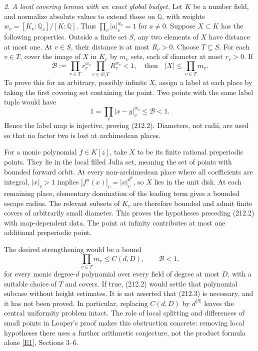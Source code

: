 \documentclass[11pt,a4paper]{article}
\newcommand{\Q}{\mathbb{Q}}
\newcommand{\eref}[2]{\hyperlink{extra:#1:#2}{[E#2]}}
\begin{document}
\textit{2. A local covering lemma with an exact global budget.}
Let $K$ be a number field, and normalize absolute values to extend those on
$\Q$, with weights $w_v=[K_v:\Q_v]/[K:\Q]$. Thus
$\prod_v|a|_v^{w_v}=1$ for $a\ne0$. Suppose $X\subset K$ has the following
properties. Outside a finite set $S$, any two elements of $X$ have distance
at most one. At $v\in S$, their distance is at most $R_v>0$. Choose
$T\subseteq S$. For each $v\in T$, cover the image of $X$ in $K_v$ by
$m_v$ sets, each of diameter at most $r_v>0$. If
\[
 \mathcal B:=\prod_{v\in T}r_v^{w_v}
             \prod_{v\in S\setminus T}R_v^{w_v}<1,
 \quad\text{then}\quad |X|\le\prod_{v\in T}m_v.                 \tag{212.2}
\]
To prove this for an arbitrary, possibly infinite $X$, assign a label at
each place by taking the first covering set containing the point. Two
points with the same label tuple would have
\[
 1=\prod_v|x-y|_v^{w_v}\le\mathcal B<1.
\]
Hence the label map is injective, proving (212.2). Diameters, not radii,
are used so that no factor two is lost at archimedean places.

For a monic polynomial $f\in K[z]$, take $X$ to be its finite rational
preperiodic points. They lie in the local filled Julia set, meaning the set
of points with bounded forward orbit. At every non-archimedean place where
all coefficients are integral, $|x|_v>1$ implies
$|f^n(x)|_v=|x|_v^{d^n}$, so $X$ lies in the unit disk. At each remaining
place, elementary domination of the leading term gives a bounded escape
radius. The relevant subsets of $K_v$ are therefore bounded and admit finite
covers of arbitrarily small diameter. This proves the hypotheses preceding
(212.2) with map-dependent data. The point at infinity contributes at most
one additional preperiodic point.

The desired strengthening would be a bound
\[
 \prod_{v\in T}m_v\le C(d,D),\qquad\mathcal B<1,                \tag{212.3}
\]
for every monic degree-$d$ polynomial over every field of degree at most
$D$, with a suitable choice of $T$ and covers. If true, (212.2) would settle
that polynomial subcase without height estimates. It is not asserted that
(212.3) is necessary, and it has not been proved. In particular, replacing
$C(d,D)$ by $d^{|S|}$ leaves the central uniformity problem intact. The role
of local splitting and differences of small points in Looper's proof makes
this obstruction concrete: removing local hypotheses there uses a further
arithmetic conjecture, not the product formula alone \eref{statement}{1},
Sections 3--6.
\end{document}
